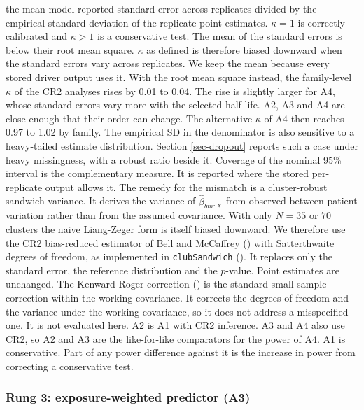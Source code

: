 \documentclass[
  11pt,
]{article}
\begin{document}
the mean model-reported standard error across replicates divided by
the empirical standard deviation of the replicate point estimates.
\(\kappa = 1\) is correctly calibrated and \(\kappa > 1\) is a
conservative test. The mean of the standard errors is below their
root mean square. \(\kappa\) as defined is therefore biased downward
when the standard errors vary across replicates. We keep the mean
because every stored driver output uses it. With the root mean square
instead, the family-level \(\kappa\) of the CR2 analyses rises by
0.01 to 0.04. The rise is
slightly larger for A4, whose standard errors vary more with the
selected half-life. A2, A3 and A4 are close enough that their order
can change. The alternative \(\kappa\) of A4 then reaches
0.97 to
1.02 by family. The empirical
SD in the denominator is also sensitive to a heavy-tailed estimate
distribution. Section \ref{sec-dropout} reports such a case under
heavy missingness, with a robust ratio beside it. Coverage of the
nominal 95\% interval is the complementary measure. It is reported
where the stored per-replicate output allows it. The remedy for the
mismatch is a cluster-robust sandwich variance. It derives the
variance of \(\hat\beta_{bm:X}\) from
observed between-patient variation rather than from the assumed
covariance. With only \(N = 35\) or \(70\) clusters the naive
Liang-Zeger form is itself biased downward. We therefore use the CR2
bias-reduced estimator of Bell and McCaffrey () with
Satterthwaite degrees of freedom, as implemented in \texttt{clubSandwich}
(). It replaces only the standard error, the
reference distribution and the \(p\)-value. Point estimates are
unchanged. The Kenward-Roger correction () is the
standard small-sample correction within the working covariance. It
corrects the degrees of freedom and the variance under the working
covariance, so it does not address a misspecified one. It is not
evaluated here. A2 is A1 with CR2 inference. A3 and A4 also use CR2,
so A2 and A3 are the like-for-like comparators for the power of A4.
A1 is conservative. Part of any power difference against it is the
increase in power from
correcting a conservative test.

\subsubsection{Rung 3: exposure-weighted predictor (A3)}\label{sec-g3}
\end{document}
